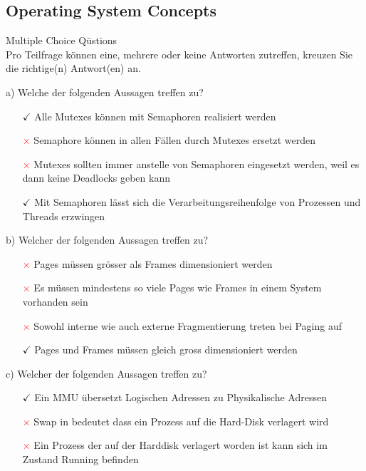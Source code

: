 \subsection{Operating System Concepts}

\begin{example2}{Multiple Choice Qüstions}\\
    Pro Teilfrage können eine, mehrere oder keine Antworten zutreffen, kreuzen Sie die richtige(n) Antwort(en) an.
    
    a) Welche der folgenden Aussagen treffen zu?
    \begin{itemize}
        \item[\textcolor{frog}{$\checkmark$}] Alle Mutexes können mit Semaphoren realisiert werden
        \item[\textcolor{red}{$\times$}] Semaphore können in allen Fällen durch Mutexes ersetzt werden  
        \item[\textcolor{red}{$\times$}] Mutexes sollten immer anstelle von Semaphoren eingesetzt werden, weil es dann keine Deadlocks geben kann
        \item[\textcolor{frog}{$\checkmark$}] Mit Semaphoren lässt sich die Verarbeitungsreihenfolge von Prozessen und Threads erzwingen
    \end{itemize}
    
    b) Welcher der folgenden Aussagen treffen zu?
    \begin{itemize}
        \item[\textcolor{red}{$\times$}] Pages müssen grösser als Frames dimensioniert werden
        \item[\textcolor{red}{$\times$}] Es müssen mindestens so viele Pages wie Frames in einem System vorhanden sein
        \item[\textcolor{red}{$\times$}] Sowohl interne wie auch externe Fragmentierung treten bei Paging auf
        \item[\textcolor{frog}{$\checkmark$}] Pages und Frames müssen gleich gross dimensioniert werden
    \end{itemize}
    
    c) Welcher der folgenden Aussagen treffen zu?
    \begin{itemize}
        \item[\textcolor{frog}{$\checkmark$}] Ein MMU übersetzt Logischen Adressen zu Physikalische Adressen
        \item[\textcolor{red}{$\times$}] Swap in bedeutet dass ein Prozess auf die Hard-Disk verlagert wird
        \item[\textcolor{red}{$\times$}] Ein Prozess der auf der Harddisk verlagert worden ist kann sich im Zustand Running befinden
    \end{itemize}
    

\end{example2}

